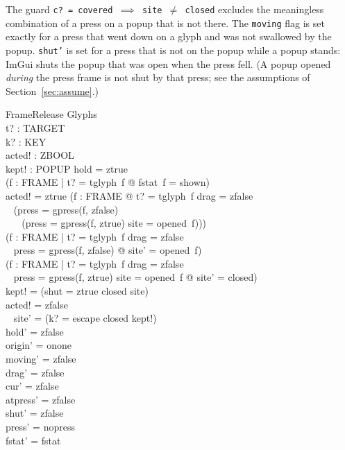 \documentclass[a4paper,10pt,fleqn]{article}
\begin{document}
The guard \texttt{c?~=~covered~$\implies$~site~$\neq$~closed} excludes the
meaningless combination of a press on a popup that is not there.  The
\texttt{moving} flag is set exactly for a press that went down on a glyph and
was not swallowed by the popup.  \texttt{shut'} is set for a press that is not
on the popup while a popup stands: ImGui shuts the popup that was open when the
press fell.  (A popup opened \emph{during} the press frame is not shut by that
press; see the assumptions of Section~\ref{sec:assume}.)

\begin{schema}{FrameRelease}
  \Delta Glyphs \\
  t? : TARGET \\
  k? : KEY \\
  acted! : ZBOOL \\
  kept! : POPUP
\where
  hold = ztrue \\
  (\forall f : FRAME | t? = tglyph~f @ fstat~f = shown) \\
  acted! = ztrue \iff (\exists f : FRAME @ t? = tglyph~f \land drag = zfalse \\
  \quad~ \land (press = gpress(f, zfalse) \\
  \quad~ \quad~ \lor (press = gpress(f, ztrue) \land site = opened~f))) \\
  (\forall f : FRAME | t? = tglyph~f \land drag = zfalse \\
  \quad~ \land press = gpress(f, zfalse) @ site' = opened~f) \\
  (\forall f : FRAME | t? = tglyph~f \land drag = zfalse \\
  \quad~ \land press = gpress(f, ztrue) \land site = opened~f @ site' = closed) \\
  kept! = (\IF shut = ztrue \THEN closed \ELSE site) \\
  acted! = zfalse \implies \\
  \quad~ site' = (\IF k? = escape \THEN closed \ELSE kept!) \\
  hold' = zfalse \\
  origin' = onone \\
  moving' = zfalse \\
  drag' = zfalse \\
  cur' = zfalse \\
  atpress' = zfalse \\
  shut' = zfalse \\
  press' = nopress \\
  fstat' = fstat \\

\end{schema}
\end{document}
